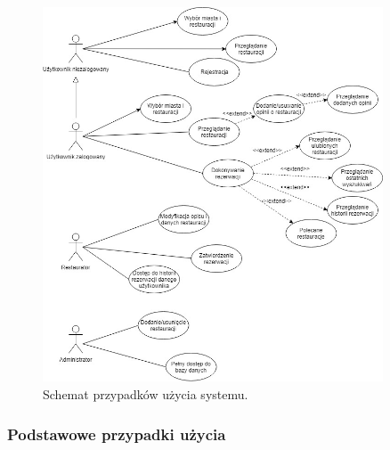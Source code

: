 \documentclass{article}
\begin{document}
\begin{figure}
\centering
	\includegraphics[width=0.90\textwidth]{use_case.jpg}
	\caption{Schemat przypadków użycia systemu.}
\end{figure}

\subsubsection{Podstawowe przypadki użycia}
\end{document}
